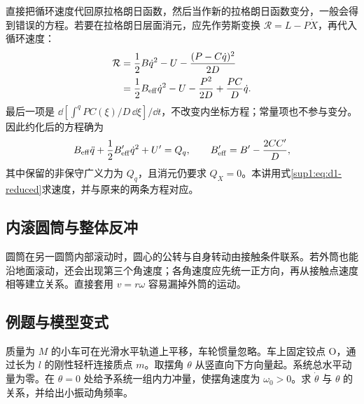直接把循环速度代回原拉格朗日函数，然后当作新的拉格朗日函数变分，一般会得到错误的方程。若要在拉格朗日层面消元，应先作劳斯变换 $\mathcal R=L-P\dot X$，再代入循环速度：
\[
\begin{aligned}
\mathcal R&=\frac12B\dot q^2-U-\frac{(P-C\dot q)^2}{2D}\\
&=\frac12B_{\rm eff}\dot q^2-U-\frac{P^2}{2D}+\frac{PC}{D}\dot q.
\end{aligned}
\]
最后一项是 $\dd[\int^q PC(\xi)/D\,\dd\xi]/\dd t$，不改变内坐标方程；常量项也不参与变分。因此约化后的方程确为
\[
B_{\rm eff}\ddot q+\frac12B_{\rm eff}'\dot q^2+U'=Q_q,
\qquad B_{\rm eff}'=B'-\frac{2CC'}D,
\]
其中保留的非保守广义力为 $Q_q$，且消元仍要求 $Q_X=0$。本讲用式\eqref{sup1:eq:d1-reduced}求速度，并与原来的两条方程对应。


\subsection{内滚圆筒与整体反冲}
圆筒在另一圆筒内部滚动时，圆心的公转与自身转动由接触条件联系。若外筒也能沿地面滚动，还会出现第三个角速度；各角速度应先统一正方向，再从接触点速度相等建立关系。直接套用 $v=r\omega$ 容易漏掉外筒的运动。


\subsection{例题与模型变式}

\begin{example}[小车上的有限振幅摆]\label{sup1:problem-example-8}\label{sup1:example:d1-e8}
质量为 $M$ 的小车可在光滑水平轨道上平移，车轮惯量忽略。车上固定铰点 O，通过长为 $l$ 的刚性轻杆连接质点 $m$。取摆角 $\theta$ 从竖直向下方向量起。系统总水平动量为零。在 $\theta=0$ 处给予系统一组内力冲量，使摆角速度为 $\omega_0>0$。求 $\dot\theta$ 与 $\theta$ 的关系，并给出小振动角频率。
\end{example}

